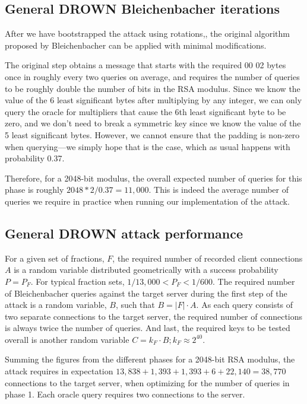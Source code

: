 \subsection{General DROWN Bleichenbacher iterations}
\label{sec:general-bleichenbacher}
After we have bootstrapped the attack using rotations,, the original algorithm proposed by Bleichenbacher can be applied with minimal modifications.

The original step obtains a message that starts with the required 00 02 bytes once in roughly every two queries on average, and requires the number of queries to be roughly double the number of bits in the RSA modulus.
Since we know the value of the 6 least significant bytes after multiplying by any integer, we can only query the oracle for multipliers that cause the 6th least significant byte to be zero, and we don't need to break a symmetric key since we know the value of the 5 least significant bytes.
However, we cannot ensure that the padding is non-zero when querying---we simply hope that is the case, which as usual happens with probability 0.37.

Therefore, for a 2048-bit modulus, the overall expected number of queries for this phase is roughly $2048 * 2 / 0.37 = 11,000$. This is indeed the average number of queries we require in practice when running our implementation of the attack.

\subsection{General DROWN attack performance}
\label{sec:general-performance}

For a given set of fractions, $F$,
the required number of recorded client connections $A$ is a random variable distributed geometrically with a success probability $P = P_F$.
For typical fraction sets, $1/13,000 < P_F < 1/600$.
The required number of Bleichenbacher queries against the target server during the first step of the attack is a random variable, $B$, such that $B = |F| \cdot A$.
As each query consists of two separate connections to the target server, the required number of connections is always  twice the number of queries.
And last, the required keys to be tested overall is another random variable $C = k_F \cdot B; k_F \approx 2^{40}$.

Summing the figures from the different phases for a 2048-bit RSA modulus, the attack requires in expectation $13,838 + 1,393 + 1,393 + 6 + 22,140 = 38,770$ connections to the target server, when optimizing for the number of queries in phase 1.  Each oracle query requires two connections to the server.

